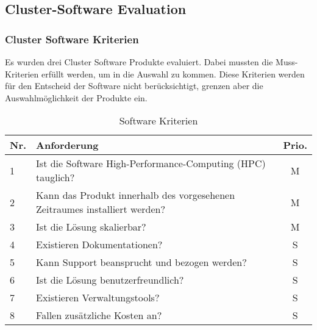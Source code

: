 \subsection{Cluster-Software Evaluation}
\subsubsection{Cluster Software Kriterien}
Es wurden drei Cluster Software Produkte evaluiert. Dabei mussten die Muss-Kriterien erfüllt werden, um in die Auswahl zu kommen. Diese Kriterien werden für den Entscheid der Software nicht berücksichtigt, grenzen aber die Auswahlmöglichkeit der Produkte ein.

\begin{table}[H]
\begin{tabular}[t]{p{0.7cm}p{14cm}c}
\hline
\rowcolor{heading}\textbf{Nr.} & \textbf{Anforderung} & \textbf{Prio.} \\\hline
1 & Ist die Software High-Performance-Computing (HPC) tauglich? & M \\\hline
2 & Kann das Produkt innerhalb des vorgesehenen Zeitraumes installiert werden? & M \\\hline
3 & Ist die Lösung skalierbar? &  M \\\hline
4 & Existieren Dokumentationen? & S \\\hline
5 & Kann Support beansprucht und bezogen werden? & S \\\hline
6 & Ist die Lösung benutzerfreundlich? & S \\\hline
7 & Existieren Verwaltungstools? & S \\\hline
8 & Fallen zusätzliche Kosten an? & S \\\hline
\end{tabular}
\caption{Software Kriterien}
\end{table}


